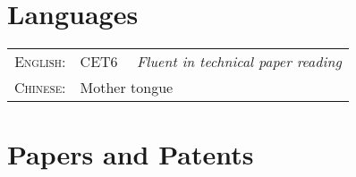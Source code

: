 \documentclass[a4paper,10pt]{article} %
\begin{document}

\section{Languages}

\begin{tabular}{rl}
\textsc{English:} & CET6 \ \ \emph{Fluent in technical paper reading}\\

\textsc{Chinese:} & Mother tongue\\

\end{tabular}



\section{Papers and Patents}
\end{document}
